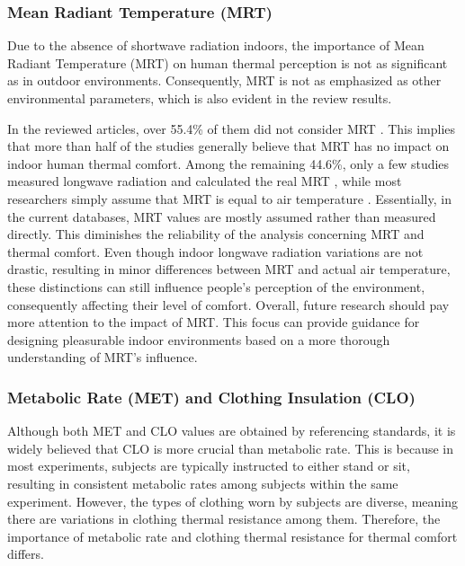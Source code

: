 \documentclass[final,3p,times,12pt]{elsarticle}
\begin{document}
\subsubsection{Mean Radiant Temperature (MRT)}

Due to the absence of shortwave radiation indoors, the importance of Mean Radiant Temperature (MRT) on human thermal perception is not as significant as in outdoor environments. Consequently, MRT is not as emphasized as other environmental parameters, which is also evident in the review results. 

In the reviewed articles, over 55.4\% of them did not consider MRT \cite{djamilaFieldStudyThermal2013,heidariComparativeAnalysisShortterm2002}. This implies that more than half of the studies generally believe that MRT has no impact on indoor human thermal comfort. Among the remaining 44.6\%, only a few studies measured longwave radiation and calculated the real MRT \cite{caoFieldStudyHuman2011,tanabeThermalComfortProductivity2013}, while most researchers simply assume that MRT is equal to air temperature \cite{duMethodDeterminingAcceptable2021,mouFieldStudyThermal2022}. Essentially, in the current databases, MRT values are mostly assumed rather than measured directly. This diminishes the reliability of the analysis concerning MRT and thermal comfort. Even though indoor longwave radiation variations are not drastic, resulting in minor differences between MRT and actual air temperature, these distinctions can still influence people's perception of the environment, consequently affecting their level of comfort. Overall, future research should pay more attention to the impact of MRT. This focus can provide guidance for designing pleasurable indoor environments based on a more thorough understanding of MRT's influence.

\subsubsection{Metabolic Rate (MET) and Clothing Insulation (CLO)}

Although both MET and CLO values are obtained by referencing standards, it is widely believed that CLO is more crucial than metabolic rate. This is because in most experiments, subjects are typically instructed to either stand or sit, resulting in consistent metabolic rates among subjects within the same experiment. However, the types of clothing worn by subjects are diverse, meaning there are variations in clothing thermal resistance among them. Therefore, the importance of metabolic rate and clothing thermal resistance for thermal comfort differs. 
\end{document}
